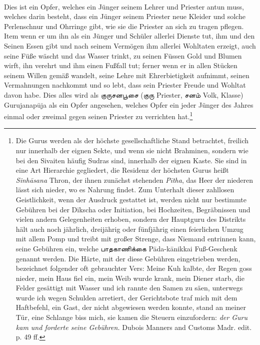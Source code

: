 \documentclass{article}
\newcommand{\TamilText}[1]{\texttamil{#1}}
\newcommand{\tam}[1]{\TamilText{#1}}
\begin{document}
\paragraph{}
Dies ist ein Opfer, welches ein Jünger seinem Lehrer und Priester antun muss, welches darin besteht, dass ein Jünger seinem Priester neue Kleider und solche Perlenschnur und Ohrringe gibt, wie sie die Priester an sich zu tragen pflegen. Item wenn er um ihn als ein Jünger und Schüler allerlei Dienste tut, ihm und den Seinen Essen gibt und nach seinem Vermögen ihm allerlei Wohltaten erzeigt, auch seine Füße wäscht und das Wasser trinkt, zu seinen Füssen Gold und Blumen wirft, ihn verehrt und ihm einen Fußfall tut; ferner wenn er in allen Stücken seinem Willen gemäß wandelt, seine Lehre mit Ehrerbietigkeit aufnimmt, seinen Vermahnungen nachkommt und so lebt, dass sein Priester Freude und Wohltat davon habe. Dies alles wird als \tam{குருசனபூசை} (\tam{குரு} Priester, \tam{சனம்} Volk, Klasse) Gurujanap\={u}ja als ein Opfer angesehen, welches Opfer ein jeder Jünger des Jahres einmal oder zweimal gegen seinen Priester zu verrichten hat.\footnote{Die Gurus werden als der höchste gesellschaftliche Stand betrachtet, freilich nur innerhalb der eignen Sekte, und wenn sie nicht Brahminen, sondern wie bei den Sivaiten häufig Sudras sind, innerhalb der eignen Kaste. Sie sind in eine Art Hierarchie gegliedert, die Residenz der höchsten Gurus heißt \emph{Sinh\={a}sana} Thron, der ihnen zunächst stehenden \emph{P\={i}tha}, das Heer der niederen lässt sich nieder, wo es Nahrung findet. Zum Unterhalt dieser zahllosen Geistlichkeit, wenn der Ausdruck gestattet ist, werden nicht nur bestimmte Gebühren bei der D\={i}kscha oder Initiation, bei Hochzeiten, Begräbnissen und vielen andern Gelegenheiten erhoben, sondern der Hauptguru des Distrikts hält auch noch jährlich, dreijährig oder fünfjährig einen feierlichen Umzug mit allem Pomp und treibt mit großer Strenge, dass Niemand entrinnen kann, seine Gebühren ein, welche \tam{பாதகாணிக்கை} P\={a}da-k\={a}nikkai Fuß-Geschenk genannt werden. Die Härte, mit der diese Gebühren eingetrieben werden, bezeichnet folgender oft gebrauchter Vers: Meine Kuh kalbte, der Regen goss nieder, mein Haus fiel ein, mein Weib wurde krank, mein Diener starb, die Felder gesättigt mit Wasser und ich rannte den Samen zu säen, unterwegs wurde ich wegen Schulden arretiert, der Gerichtsbote traf mich mit dem Haftbefehl, ein Gast, der nicht abgewiesen werden konnte, stand an meiner Tür, eine Schlange biss mich, sie kamen die Steuern einzufordern: \emph{der Guru kam und forderte seine Gebühren.} Dubois Manners and Customs Madr. edit. p. 49 ff.}
\end{document}
